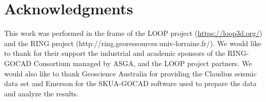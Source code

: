 \documentclass[preprint]{ring20}
\begin{document}
\section*{Acknowledgments}

This work was performed in the frame of the LOOP project (\url{https://loop3d.org/}) and the RING project (http://ring.georessources.univ-lorraine.fr/). We would like to thank for their support the industrial and academic sponsors of the RING-GOCAD Consortium managed by ASGA, and the LOOP project partners. We would also like to thank Geoscience Australia for providing the Claudius seismic data set and Emerson for the SKUA-GOCAD software used to prepare the data and analyze the results. 


\end{document}
